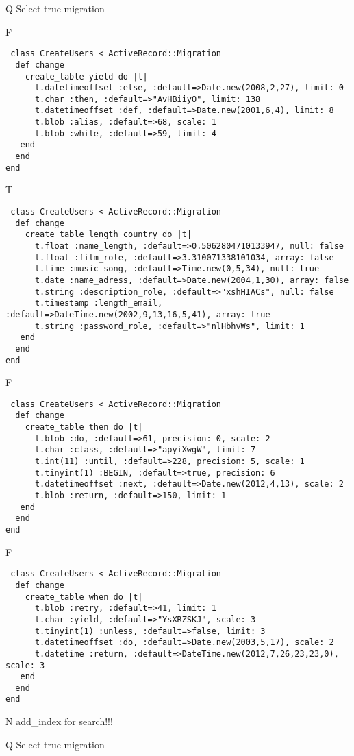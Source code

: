 Q
Select true migration

F
\begin{verbatim}
 class CreateUsers < ActiveRecord::Migration 
  def change 
    create_table yield do |t| 
      t.datetimeoffset :else, :default=>Date.new(2008,2,27), limit: 0
      t.char :then, :default=>"AvHBiiyO", limit: 138
      t.datetimeoffset :def, :default=>Date.new(2001,6,4), limit: 8
      t.blob :alias, :default=>68, scale: 1
      t.blob :while, :default=>59, limit: 4
   end 
  end 
end
\end{verbatim}

T
\begin{verbatim}
 class CreateUsers < ActiveRecord::Migration 
  def change 
    create_table length_country do |t| 
      t.float :name_length, :default=>0.5062804710133947, null: false
      t.float :film_role, :default=>3.310071338101034, array: false
      t.time :music_song, :default=>Time.new(0,5,34), null: true
      t.date :name_adress, :default=>Date.new(2004,1,30), array: false
      t.string :description_role, :default=>"xshHIACs", null: false
      t.timestamp :length_email, :default=>DateTime.new(2002,9,13,16,5,41), array: true
      t.string :password_role, :default=>"nlHbhvWs", limit: 1
   end 
  end 
end
\end{verbatim}

F
\begin{verbatim}
 class CreateUsers < ActiveRecord::Migration 
  def change 
    create_table then do |t| 
      t.blob :do, :default=>61, precision: 0, scale: 2
      t.char :class, :default=>"apyiXwgW", limit: 7
      t.int(11) :until, :default=>228, precision: 5, scale: 1
      t.tinyint(1) :BEGIN, :default=>true, precision: 6
      t.datetimeoffset :next, :default=>Date.new(2012,4,13), scale: 2
      t.blob :return, :default=>150, limit: 1
   end 
  end 
end
\end{verbatim}

F
\begin{verbatim}
 class CreateUsers < ActiveRecord::Migration 
  def change 
    create_table when do |t| 
      t.blob :retry, :default=>41, limit: 1
      t.char :yield, :default=>"YsXRZSKJ", scale: 3
      t.tinyint(1) :unless, :default=>false, limit: 3
      t.datetimeoffset :do, :default=>Date.new(2003,5,17), scale: 2
      t.datetime :return, :default=>DateTime.new(2012,7,26,23,23,0), scale: 3
   end 
  end 
end
\end{verbatim}
N
add_index for search!!!
  
Q
Select true migration

